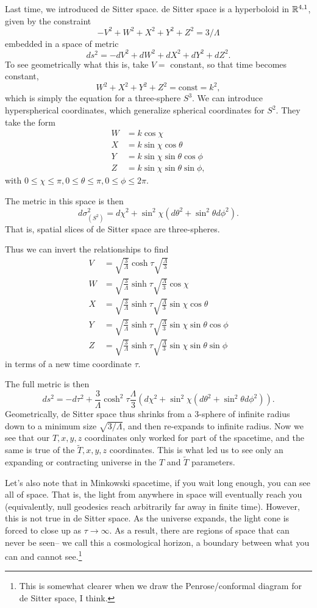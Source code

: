 Last time, we introduced de Sitter space. de Sitter space is a hyperboloid in $\mathbb{R}^{4,1}$, given by the constraint
$$-V^2+W^2+X^2+Y^2+Z^2=3/\Lambda$$
embedded in a space of metric
$$ds^2=-dV^2+dW^2+dX^2+dY^2+dZ^2.$$
To see geometrically what this is, take $V=$ constant, so that time becomes constant,
$$W^2+X^2+Y^2+Z^2=\text{const}=k^2,$$ which is simply the equation for a three-sphere $S^3$. We can introduce hyperspherical coordinates, which generalize spherical coordinates for $S^2$. They take the form
\begin{align*}
W&=k\cos\chi\\
X&=k\sin\chi \cos\theta\\
Y&=k\sin\chi\sin\theta \cos\phi\\
Z&=k\sin\chi\sin\theta\sin\phi,
\end{align*}
with $0\leq \chi \leq \pi, 0\leq \theta\leq \pi, 0\leq \phi \leq 2\pi.$

The metric in this space is then
$$d\sigma^2_{(S^2)}=d\chi^2 + \sin^2\chi (d\theta^2+\sin^2\theta d\phi^2).$$
That is, spatial slices of de Sitter space are three-spheres.

Thus we can invert the relationships to find
\begin{align*}
V&=\sqrt{\frac{3}{\Lambda}}\cosh\tau \sqrt{\frac{\Lambda}{3}}\\
W&=\sqrt{\frac{3}{\Lambda}}\sinh\tau \sqrt{\frac{\Lambda}{3}}\cos\chi\\
X&=\sqrt{\frac{3}{\Lambda}}\sinh\tau \sqrt{\frac{\Lambda}{3}}\sin\chi\cos\theta\\
Y&=\sqrt{\frac{3}{\Lambda}}\sinh\tau \sqrt{\frac{\Lambda}{3}}\sin\chi\sin\theta\cos\phi\\
Z&=\sqrt{\frac{3}{\Lambda}}\sinh\tau \sqrt{\frac{\Lambda}{3}}\sin\chi\sin\theta\sin\phi
\end{align*}
in terms of a new time coordinate $\tau$.

The full metric is then
$$ds^2=-d\tau^2+\frac{3}{\Lambda}\cosh^2\tau \frac{\Lambda}{3}\left(d\chi^2 + \sin^2\chi (d\theta^2+\sin^2\theta d\phi^2)\right).$$
Geometrically, de Sitter space thus shrinks from a $3$-sphere of infinite radius down to a minimum size $\sqrt{3/\Lambda}$, and then re-expands to infinite radius.
Now we see that our $T,x,y,z$ coordinates only worked for part of the spacetime, and the same is true of the $\tilde T,x,y,z$ coordinates. This is what led us to see only an expanding or contracting universe in the $T$ and $\tilde T$ parameters.

Let's also note that in Minkowski spacetime, if you wait long enough, you can see all of space. That is, the light from anywhere in space will eventually reach you (equivalently, null geodesics reach arbitrarily far away in finite time). However, this is not true in de Sitter space. As the universe expands, the light cone is forced to close up as $\tau\to \infty$. As a result, there are regions of space that can never be seen-- we call this a cosmological horizon, a boundary between what you can and cannot see.\footnote{This is somewhat clearer when we draw the Penrose/conformal diagram for de Sitter space, I think.}


